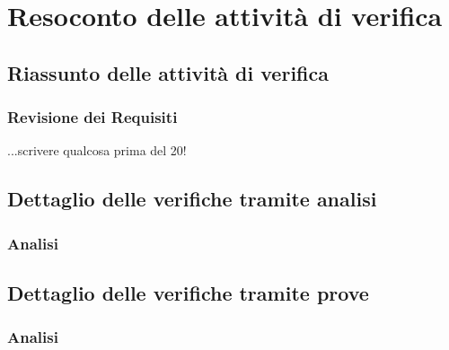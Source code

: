 \section{Resoconto delle attività di verifica}
	\subsection{Riassunto delle attività di verifica}
	 	\subsubsection{Revisione dei Requisiti}
	 	...scrivere qualcosa prima del 20!
	 
	 \subsection{Dettaglio delle verifiche tramite analisi}
	 	\subsubsection{Analisi}
	 	
	 \subsection{Dettaglio delle verifiche tramite prove}
		\subsubsection{Analisi}
	 
	 


	
